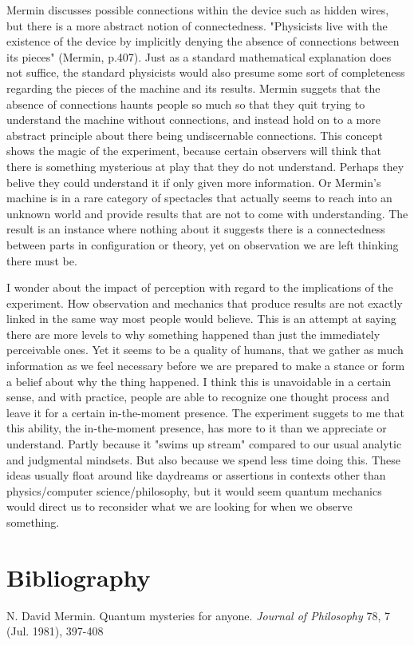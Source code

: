 \documentclass[11pt]{article}
\begin{document}
Mermin discusses possible connections within the device such as hidden wires, but there is a more abstract notion of connectedness. 
"Physicists live with the existence of the device by implicitly denying the absence of connections between its pieces" (Mermin, p.407). 
Just as a standard mathematical explanation does not suffice, the standard physicists would also presume some sort of 
completeness regarding the pieces of the machine and its results. Mermin suggets that the absence of connections haunts people
so much so that they quit trying to understand the machine without connections, and instead hold on to a more abstract principle about 
there being undiscernable connections. This concept shows the magic of the experiment, because certain observers will think 
that there is something mysterious at play that they do not understand. Perhaps they belive they could understand it if only
given more information. Or Mermin's machine is in a rare category of spectacles that actually seems to reach into an 
unknown world and provide results that are not to come with understanding.
The result is an instance where nothing 
about it suggests there is a connectedness between parts in configuration or theory, yet on observation we are left thinking
there must be. 

I wonder about the impact of perception with regard to the implications of the experiment. How observation and mechanics that produce results
are not exactly linked in the same way most people would believe. This is an attempt at saying there are more levels to why something happened 
than just the immediately perceivable ones. Yet it seems to be a quality of humans, that we gather as much information as we feel necessary
before we are prepared to make a stance or form a belief about why the thing happened. I think this is unavoidable in a certain sense, and with 
practice, people are able to recognize one thought process and leave it for a certain in-the-moment presence. The experiment suggets to me 
that this ability, the in-the-moment presence, has more to it than we appreciate or understand. Partly because it "swims up stream" compared to
our usual analytic and judgmental mindsets. But also because we spend less time doing this. These ideas usually float around like daydreams or 
assertions in contexts other than physics/computer science/philosophy, but it would seem quantum mechanics would direct us to reconsider
what we are looking for when we observe something. 

\newpage
\section{Bibliography}  %
\begin{hangparas}{.25in}{1}
N. David Mermin. Quantum mysteries for anyone. \textit{Journal of Philosophy} 78, 7 (Jul. 1981), 397-408

\end{hangparas}
\end{document}
